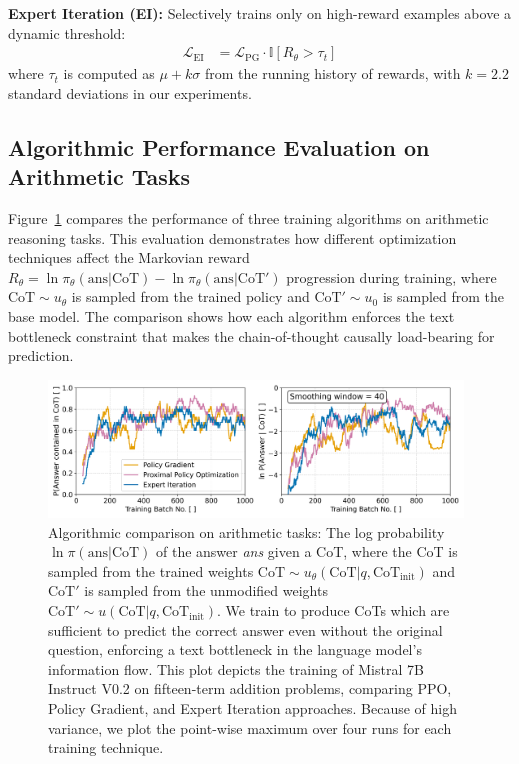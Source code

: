 \documentclass{article}
\begin{document}
\textbf{Expert Iteration (EI):} Selectively trains only on high-reward examples above a dynamic threshold:
\begin{align}
\mathcal{L}_{\text{EI}} &= \mathcal{L}_{\text{PG}} \cdot \mathbb{I}[R_\theta > \tau_t]
\end{align}
where $\tau_t$ is computed as $\mu + k\sigma$ from the running history of rewards, with $k = 2.2$ standard deviations in our experiments.

\subsection{Algorithmic Performance Evaluation on Arithmetic Tasks}
Figure~\ref{fig:cot_arithmetic_performance} compares the performance of three training algorithms on arithmetic reasoning tasks. This evaluation demonstrates how different optimization techniques affect the Markovian reward $R_\theta = \ln \pi_\theta(\text{ans} | \text{CoT}) - \ln \pi_\theta(\text{ans} | \text{CoT}')$ progression during training, where $\text{CoT} \sim u_\theta$ is sampled from the trained policy and $\text{CoT}' \sim u_0$ is sampled from the base model. The comparison shows how each algorithm enforces the text bottleneck constraint that makes the chain-of-thought causally load-bearing for prediction.

\begin{figure}[ht]
    \centering
    \includegraphics[width=0.98\textwidth]{Figures/cot_performance_comparison.png}
    \caption{Algorithmic comparison on arithmetic tasks: The log probability $\ln \pi(\text{ans} | \text{CoT})$ of the answer \textit{ans} given a CoT, where the CoT is sampled from the trained weights $\text{CoT} \sim u_\theta(\text{CoT} | q, \text{CoT}_{\text{init}})$ and $\text{CoT}'$ is sampled from the unmodified weights $\text{CoT}' \sim u(\text{CoT} | q, \text{CoT}_{\text{init}})$. We train to produce CoTs which are sufficient to predict the correct answer even without the original question, enforcing a text bottleneck in the language model's information flow. This plot depicts the training of Mistral 7B Instruct V0.2 on fifteen-term addition problems, comparing PPO, Policy Gradient, and Expert Iteration approaches. Because of high variance, we plot the point-wise maximum over four runs for each training technique.}
    \label{fig:cot_arithmetic_performance}
\end{figure}
\end{document}
